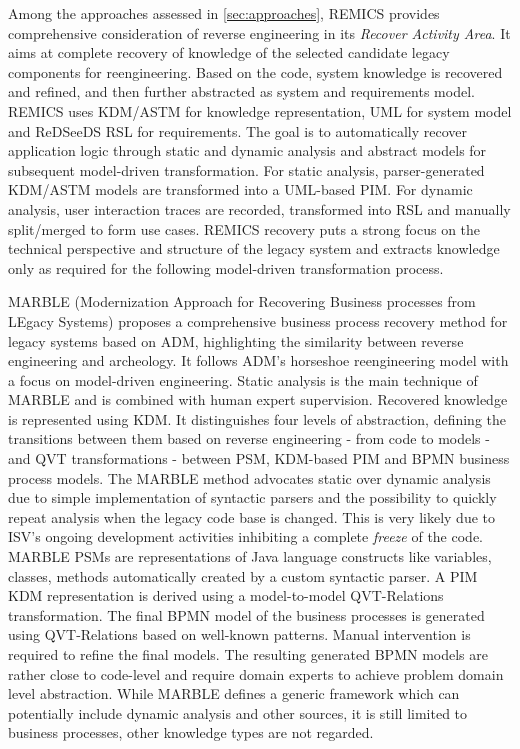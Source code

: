 Among the approaches assessed in \cref{sec:approaches}, REMICS \autocite{REMICS2013RecoverPrinciples,Remics2013RecoverToolkit,Krasteva2013REMICSAgile} provides comprehensive consideration of reverse engineering in its \emph{Recover Activity Area}.
It aims at complete recovery of knowledge of the selected candidate legacy components for reengineering.
Based on the code, system knowledge is recovered and refined, and then further abstracted as system and requirements model.
REMICS uses KDM/ASTM for knowledge representation, UML for system model and ReDSeeDS RSL \autocite{Kaindl2009RSL} for requirements.
The goal is to automatically recover application logic through static and dynamic analysis and abstract models for subsequent model-driven transformation.
For static analysis, parser-generated KDM/ASTM models are transformed into a UML-based PIM.
For dynamic analysis, user interaction traces are recorded, transformed into RSL and manually split/merged to form use cases.
REMICS recovery puts a strong focus on the technical perspective and structure of the legacy system and extracts knowledge only as required for the following model-driven transformation process.

MARBLE (Modernization Approach for Recovering Business processes
from LEgacy Systems) \autocite{Perez-Castillo2011MARBLE,Perez-Castillo2011a} proposes a comprehensive business process recovery method for legacy systems based on ADM, highlighting the similarity between reverse engineering and archeology.
It follows ADM's horseshoe reengineering model with a focus on model-driven engineering.
Static analysis is the main technique of MARBLE and is combined with human expert supervision.
Recovered knowledge is represented using KDM.
It distinguishes four levels of abstraction, defining the transitions between them based on reverse engineering - from code to models - and QVT transformations - between PSM, KDM-based PIM and BPMN business process models.
The MARBLE method advocates static over dynamic analysis due to simple implementation of syntactic parsers and the possibility to quickly repeat analysis when the legacy code base is changed.
This is very likely due to ISV's ongoing development activities inhibiting a complete \emph{freeze} \autocite{ISO/IEEE24765Vocabulary} of the code.
MARBLE PSMs are representations of Java language constructs like variables, classes, methods automatically created by a custom syntactic parser.
A PIM KDM representation is derived using a model-to-model QVT-Relations transformation.
The final BPMN model of the business processes is generated using QVT-Relations based on well-known patterns.
Manual intervention is required to refine the final models.
The resulting generated BPMN models are rather close to code-level and require domain experts to achieve problem domain level abstraction.
While MARBLE defines a generic framework which can potentially include dynamic analysis and other sources, it is still limited to business processes, other knowledge types are not regarded.

